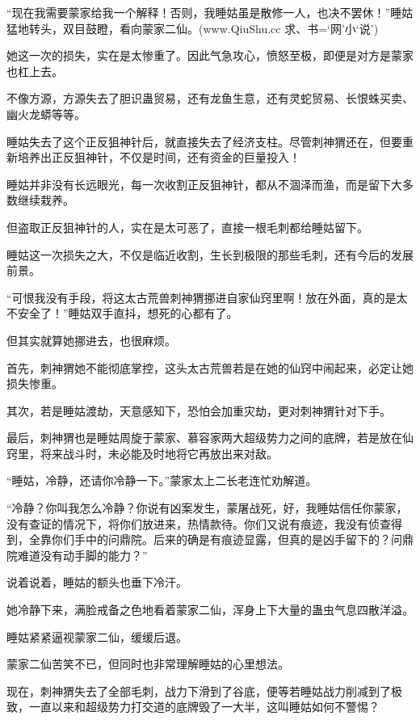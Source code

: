 
\begin{this_body}

“现在我需要蒙家给我一个解释！否则，我睡姑虽是散修一人，也决不罢休！”睡姑猛地转头，双目鼓瞪，看向蒙家二仙。(www.QiuShu.cc 求、书=‘网’小‘说’)

她这一次的损失，实在是太惨重了。因此气急攻心，愤怒至极，即便是对方是蒙家也杠上去。

不像方源，方源失去了胆识蛊贸易，还有龙鱼生意，还有灵蛇贸易、长恨蛛买卖、幽火龙蟒等等。

睡姑失去了这个正反狙神针后，就直接失去了经济支柱。尽管刺神猬还在，但要重新培养出正反狙神针，不仅是时间，还有资金的巨量投入！

睡姑并非没有长远眼光，每一次收割正反狙神针，都从不涸泽而渔，而是留下大多数继续栽养。

但盗取正反狙神针的人，实在是太可恶了，直接一根毛刺都给睡姑留下。

睡姑这一次损失之大，不仅是临近收割，生长到极限的那些毛刺，还有今后的发展前景。

“可恨我没有手段，将这太古荒兽刺神猬挪进自家仙窍里啊！放在外面，真的是太不安全了！”睡姑双手直抖，想死的心都有了。

但其实就算她挪进去，也很麻烦。

首先，刺神猬她不能彻底掌控，这头太古荒兽若是在她的仙窍中闹起来，必定让她损失惨重。

其次，若是睡姑渡劫，天意感知下，恐怕会加重灾劫，更对刺神猬针对下手。

最后，刺神猬也是睡姑周旋于蒙家、慕容家两大超级势力之间的底牌，若是放在仙窍里，将来战斗时，未必能及时地将它再放出来对敌。

“睡姑，冷静，还请你冷静一下。”蒙家太上二长老连忙劝解道。

“冷静？你叫我怎么冷静？你说有凶案发生，蒙屠战死，好，我睡姑信任你蒙家，没有查证的情况下，将你们放进来，热情款待。你们又说有痕迹，我没有侦查得到，全靠你们手中的问鼎院。后来的确是有痕迹显露，但真的是凶手留下的？问鼎院难道没有动手脚的能力？”

说着说着，睡姑的额头也垂下冷汗。

她冷静下来，满脸戒备之色地看着蒙家二仙，浑身上下大量的蛊虫气息四散洋溢。

睡姑紧紧逼视蒙家二仙，缓缓后退。

蒙家二仙苦笑不已，但同时也非常理解睡姑的心里想法。

现在，刺神猬失去了全部毛刺，战力下滑到了谷底，便等若睡姑战力削减到了极致，一直以来和超级势力打交道的底牌毁了一大半，这叫睡姑如何不警惕？


\end{this_body}
